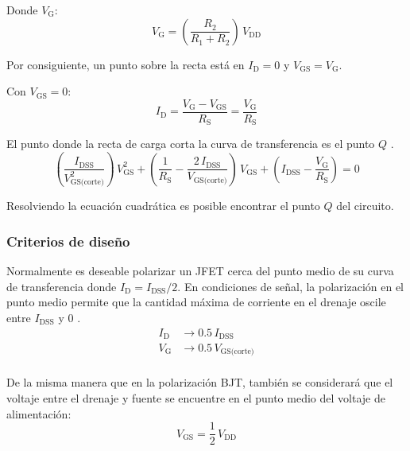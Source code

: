 Donde $V_{\text{G}}$:
\begin{equation*}
    V_{\text{G}} = \left(\frac{R_2}{R_1+R_2}\right)\,V_{\text{DD}}
\end{equation*}

Por consiguiente, un punto sobre la recta está en $I_{\text{D}} = 0$ y
$V_{\text{GS}} = V_{\text{G}}$.

Con $V_{\text{GS}} = 0$:
\begin{equation*}
    I_\text{D} = \frac{V_{\text{G}} - V_{\text{GS}}}{R_{\text{S}}}
               = \frac{V_{\text{G}}}{R_{\text{S}}}
\end{equation*}

El punto donde la recta de carga corta la curva de transferencia es el punto
$Q$ \cite{Floyd}.
\begin{equation*}
    \left(\frac{I_{\text{DSS}}}{V_{\text{GS(corte)}}^2}\right)\,
    V_{\text{GS}}^2 + \left(\frac{1}{R_{\text{S}}}-
    \frac{2\,I_{\text{DSS}}}{V_{\text{GS(corte)}}}\right)\,
    V_{\text{GS}}+
    \left(I_{\text{DSS}}-\frac{V_{\text{G}}}{R_{\text{S}}}\right) = 0
\end{equation*}

Resolviendo la ecuación cuadrática es posible encontrar el punto $Q$ del
circuito.

\subsubsection{Criterios de diseño}
Normalmente es deseable polarizar un JFET cerca del punto medio de su curva de
transferencia donde $I_{\text{D}} = I_{\text{DSS}}/2$. En condiciones de señal,
la polarización en el punto medio permite que la cantidad máxima de corriente en
el drenaje oscile entre $I_{\text{DSS}}$ y $0$ \cite{Floyd}.
\begin{equation*}
    \begin{split}
        I_{\text{D}} &\rightarrow 0.5\,I_{\text{DSS}}\\
        V_{\text{G}} &\rightarrow 0.5\,V_{\text{GS(corte)}}\\
    \end{split}
\end{equation*}

De la misma manera que en la polarización BJT, también se considerará que el
voltaje entre el drenaje y fuente se encuentre en el punto medio del voltaje de
alimentación:
\begin{equation*}
    V_{\text{GS}} = \frac{1}{2}\,V_{\text{DD}}
\end{equation*}

